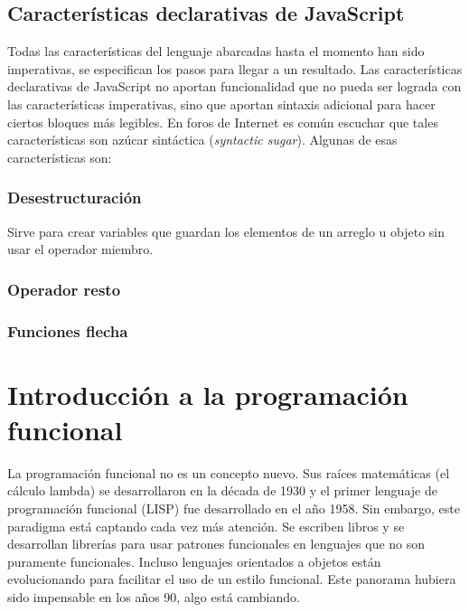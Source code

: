 \documentclass{article}
\newcommand{\codejs}[1]{\tcbox{\lstinline[style=ES6]{#1}}}
\begin{document}
\subsection{Características declarativas de JavaScript}
Todas las características del lenguaje abarcadas hasta el momento han sido imperativas, se especifican los pasos para llegar a un resultado. Las características declarativas de JavaScript no aportan funcionalidad que no pueda ser lograda con las características imperativas, sino que aportan sintaxis adicional para hacer ciertos bloques más legibles. En foros de Internet es común escuchar que tales características son azúcar sintáctica (\textit{syntactic sugar}). Algunas de esas características son:

\subsubsection{Desestructuración}
Sirve para crear variables que guardan los elementos de un arreglo u objeto sin usar el operador miembro. 

\subsubsection{Operador resto \codejs{...}}

\subsubsection{Funciones flecha}


\section{Introducción a la programación funcional}
\label{sec:fp-intro}
La programación funcional no es un concepto nuevo. Sus raíces matemáticas (el cálculo lambda) se desarrollaron en la década de 1930 y el primer lenguaje de programación funcional (LISP) fue desarrollado en el año 1958. Sin embargo, este paradigma está captando cada vez más atención. Se escriben libros y se desarrollan librerías para usar patrones funcionales en lenguajes que no son puramente funcionales. Incluso lenguajes orientados a objetos están evolucionando para facilitar el uso de un estilo funcional. Este panorama hubiera sido impensable en los años 90, algo está cambiando.\cite{why-isnt-fp-norm}
\end{document}
